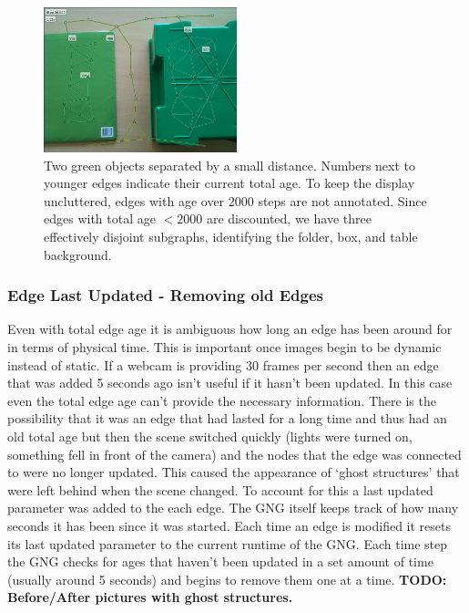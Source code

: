 \documentclass{article}
\renewcommand{\|}{\origbar} %
\begin{document}
\begin{figure}[h!]
  \centering
    \includegraphics[width=0.5\textwidth]{total_edge_age.png}

  \caption{Two green objects separated by a small distance. Numbers next to younger edges indicate their current total age. To keep the display uncluttered, edges with age over 2000 steps are not annotated. Since edges with total age $< 2000$ are discounted, we have three effectively disjoint subgraphs, identifying the folder, box, and table background.} 
  \label{fig:totalEdgeAge}
\end{figure}

\subsubsection{Edge Last Updated - Removing old Edges}

Even with total edge age it is ambiguous how long an edge has been around for in terms of physical time. This is important once images begin to be dynamic instead of static. If a webcam is providing 30 frames per second then an edge that was added 5 seconds ago isn't useful if it hasn't been updated. In this case even the total edge age can't provide the necessary information. There is the possibility that it was an edge that had lasted for a long time and thus had an old total age but then the scene switched quickly (lights were turned on, something fell in front of the camera) and the nodes that the edge was connected to were no longer updated. This caused the appearance of `ghost structures' that were left behind when the scene changed. To account for this a last updated parameter was added to the each edge. The GNG itself keeps track of how many seconds it has been since it was started. Each time an edge is modified it resets its last updated parameter to the current runtime of the GNG. Each time step the GNG checks for ages that haven't been updated in a set amount of time (usually around 5 seconds) and begins to remove them one at a time. {\bf TODO: Before/After pictures with ghost structures.}
\end{document}
